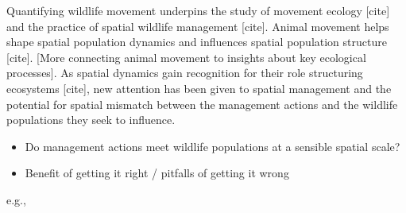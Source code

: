 \documentclass{article}
\begin{document}
Quantifying wildlife movement underpins the study of movement ecology [cite] and the practice of spatial wildlife management [cite]. Animal movement helps shape spatial population dynamics \cite[][]{morales2010} and influences spatial population structure [cite]. [More connecting animal movement to insights about key ecological processes]. As spatial dynamics gain recognition for their role structuring ecosystems [cite], new attention has been given to spatial management and the potential for spatial mismatch between the management actions and the wildlife populations they seek to influence.
\begin{itemize}
\item Do management actions meet wildlife populations at a sensible spatial scale?
\item Benefit of getting it right / pitfalls of getting it wrong %
\end{itemize}
e.g., 

\end{document}
